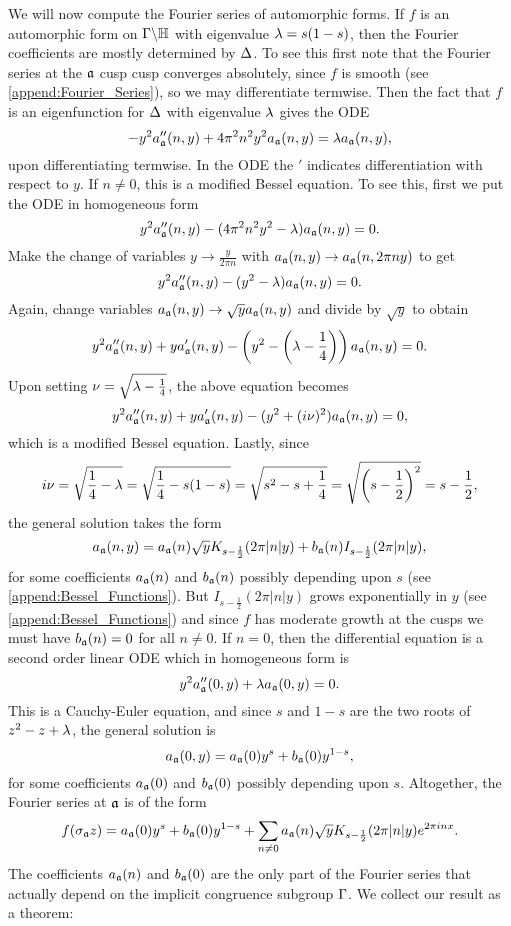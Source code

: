       We will now compute the Fourier series of automorphic forms. If $f$ is an automorphic form on $\Gamma\backslash\mathbb{H}$ with eigenvalue $\lambda = s(1-s)$, then the Fourier coefficients are mostly determined by $\Delta$. To see this first note that the Fourier series at the $\mathfrak{a}$ cusp cusp converges absolutely, since $f$ is smooth (see \cref{append:Fourier_Series}), so we may differentiate termwise. Then the fact that $f$ is an eigenfunction for $\Delta$ with eigenvalue $\lambda$ gives the ODE
      \[
        -y^{2}a''_{\mathfrak{a}}(n,y)+4\pi^{2}n^{2}y^{2}a_{\mathfrak{a}}(n,y) = \lambda a_{\mathfrak{a}}(n,y),
      \]
      upon differentiating termwise. In the ODE the $'$ indicates differentiation with respect to $y$. If $n \neq 0$, this is a modified Bessel equation. To see this, first we put the ODE in homogeneous form
      \[
        y^{2}a''_{\mathfrak{a}}(n,y)-(4\pi^{2}n^{2}y^{2}-\lambda)a_{\mathfrak{a}}(n,y) = 0.
      \]
      Make the change of variables $y \to \frac{y}{2\pi n}$ with $a_{\mathfrak{a}}(n,y) \to a_{\mathfrak{a}}(n,2\pi ny)$ to get
      \[
        y^{2}a''_{\mathfrak{a}}(n,y)-(y^{2}-\lambda)a_{\mathfrak{a}}(n,y) = 0.
      \]
      Again, change variables $a_{\mathfrak{a}}(n,y) \to \sqrt{y}a_{\mathfrak{a}}(n,y)$ and divide by $\sqrt{y}$ to obtain
      \[
        y^{2}a''_{\mathfrak{a}}(n,y)+ya'_{\mathfrak{a}}(n,y)-\left(y^{2}-\left(\lambda-\frac{1}{4}\right)\right)a_{\mathfrak{a}}(n,y) = 0.
      \]
      Upon setting $\nu = \sqrt{\lambda-\frac{1}{4}}$, the above equation becomes
      \[
        y^{2}a''_{\mathfrak{a}}(n,y)+ya'_{\mathfrak{a}}(n,y)-(y^{2}+(i\nu)^{2})a_{\mathfrak{a}}(n,y) = 0,
      \]
      which is a modified Bessel equation. Lastly, since
      \[
        i\nu = \sqrt{\frac{1}{4}-\lambda} = \sqrt{\frac{1}{4}-s(1-s)} = \sqrt{s^{2}-s+\frac{1}{4}} = \sqrt{\left(s-\frac{1}{2}\right)^{2}} = s-\frac{1}{2},
      \]
      the general solution takes the form
      \[
        a_{\mathfrak{a}}(n,y) = a_{\mathfrak{a}}(n)\sqrt{y}K_{s-\frac{1}{2}}(2\pi|n|y)+b_{\mathfrak{a}}(n)I_{s-\frac{1}{2}}(2\pi|n|y),
      \]
      for some coefficients $a_{\mathfrak{a}}(n)$ and $b_{\mathfrak{a}}(n)$ possibly depending upon $s$ (see \cref{append:Bessel_Functions}). But $I_{s-\frac{1}{2}}(2\pi|n|y)$ grows exponentially in $y$ (see \cref{append:Bessel_Functions}) and since $f$ has moderate growth at the cusps we must have $b_{\mathfrak{a}}(n) = 0$ for all $n \neq 0$. If $n = 0$, then the differential equation is a second order linear ODE which in homogeneous form is
      \[
        y^{2}a''_{\mathfrak{a}}(0,y)+\lambda a_{\mathfrak{a}}(0,y) = 0.
      \]
      This is a Cauchy-Euler equation, and since $s$ and $1-s$ are the two roots of $z^{2}-z+\lambda$, the general solution is
      \[
        a_{\mathfrak{a}}(0,y) = a_{\mathfrak{a}}(0)y^{s}+b_{\mathfrak{a}}(0)y^{1-s},
      \]
      for some coefficients $a_{\mathfrak{a}}(0)$ and $b_{\mathfrak{a}}(0)$ possibly depending upon $s$. Altogether, the Fourier series at $\mathfrak{a}$ is of the form
      \[
        f(\sigma_{\mathfrak{a}}z) = a_{\mathfrak{a}}(0)y^{s}+b_{\mathfrak{a}}(0)y^{1-s}+\sum_{n \neq 0}a_{\mathfrak{a}}(n)\sqrt{y}K_{s-\frac{1}{2}}(2\pi|n|y)e^{2\pi inx}.
      \]
      The coefficients $a_{\mathfrak{a}}(n)$ and $b_{\mathfrak{a}}(0)$ are the only part of the Fourier series that actually depend on the implicit congruence subgroup $\Gamma$. We collect our result as a theorem:


